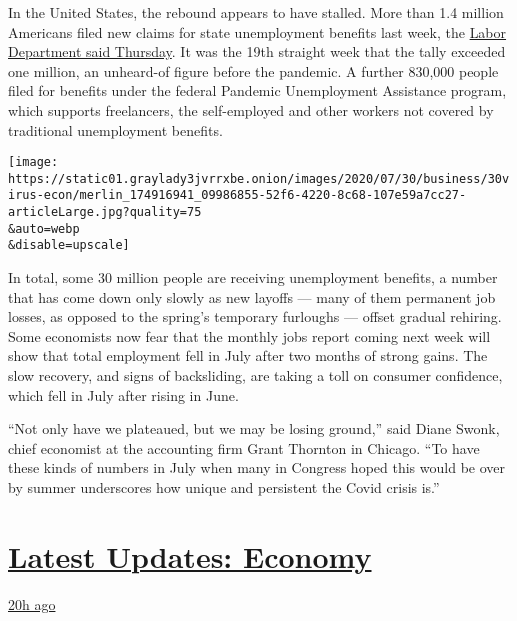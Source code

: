 In the United States, the rebound appears to have stalled. More than 1.4
million Americans filed new claims for state unemployment benefits last
week, the \href{https://oui.doleta.gov/press/2020/073020.pdf}{Labor
Department said Thursday}. It was the 19th straight week that the tally
exceeded one million, an unheard-of figure before the pandemic. A
further 830,000 people filed for benefits under the federal Pandemic
Unemployment Assistance program, which supports freelancers, the
self-employed and other workers not covered by traditional unemployment
benefits.

\texttt{[image: https://static01.graylady3jvrrxbe.onion/images/2020/07/30/business/30virus-econ/merlin\_174916941\_09986855-52f6-4220-8c68-107e59a7cc27-articleLarge.jpg?quality=75\\\&auto=webp\\\&disable=upscale]}

In total, some 30 million people are receiving unemployment benefits, a
number that has come down only slowly as new layoffs --- many of them
permanent job losses, as opposed to the spring's temporary furloughs ---
offset gradual rehiring. Some economists now fear that the monthly jobs
report coming next week will show that total employment fell in July
after two months of strong gains. The slow recovery, and signs of
backsliding, are taking a toll on consumer confidence, which fell in
July after rising in June.

``Not only have we plateaued, but we may be losing ground,'' said Diane
Swonk, chief economist at the accounting firm Grant Thornton in Chicago.
``To have these kinds of numbers in July when many in Congress hoped
this would be over by summer underscores how unique and persistent the
Covid crisis is.''

\hypertarget{latest-updates-economy}{%
\section{\texorpdfstring{\href{https://www.nytimes3xbfgragh.onion/live/2020/07/31/business/stock-market-today-coronavirus?action=click\&pgtype=Article\&state=default\&region=MAIN_CONTENT_1\&context=storylines_live_updates}{Latest
Updates:
Economy}}{Latest Updates: Economy}}\label{latest-updates-economy}}

\href{https://www.nytimes3xbfgragh.onion/live/2020/07/31/business/stock-market-today-coronavirus?action=click\&pgtype=Article\&state=default\&region=MAIN_CONTENT_1\&context=storylines_live_updates\#kodaks-chief-executive-was-given-stock-options-then-the-share-price-spiked-1000-percent}{20h
ago}


